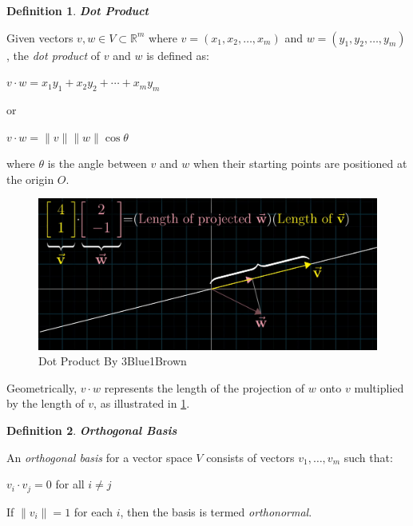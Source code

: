 \documentclass[a4paper,12pt]{report}
\newtheorem{definition}{Definition}[section]
\newcommand{\R}{\mathbb{R}}
\begin{document}
\begin{definition}
    \textbf{Dot Product}
\end{definition}

Given vectors $v, w \in V \subset \R^m$ where $v = (x_1, x_2, \ldots, x_m)$ and $w = (y_1, y_2, \ldots, y_m)$, the \textit{dot product} of $v$ and $w$ is defined as:

\begin{center}
    $v \cdot w = x_1y_1 + x_2y_2 + \cdots + x_my_m$

    or

    $v \cdot w = \lVert v \rVert \lVert w \rVert \cos{\theta}$
\end{center}

where $\theta$ is the angle between $v$ and $w$ when their starting points are positioned at the origin $O$.

\begin{figure}[!b]
    \centering
    \includegraphics[scale=0.2]{./img/dot_product.png}
    \caption{Dot Product By 3Blue1Brown \cite{3b1b}}
    \label{fig:dot_product}
\end{figure}

Geometrically, $v \cdot w$ represents the length of the projection of $w$ onto $v$ multiplied by the length of $v$, as illustrated in \ref{fig:dot_product}.

\begin{definition}
    \textbf{Orthogonal Basis}
\end{definition}

An \textit{orthogonal basis} for a vector space $V$ consists of vectors $v_1, \ldots, v_m$ such that:

\begin{center}
    $v_i \cdot v_j = 0$ for all $i \neq j$
\end{center}

If $\lVert v_i \rVert = 1$ for each $i$, then the basis is termed \textit{orthonormal}.
\end{document}
